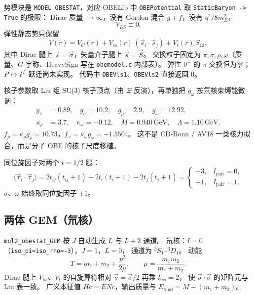\documentclass[12pt,a4paper]{article}
\newcommand{\GeV}{\,\mathrm{GeV}}
\begin{document}
势模块是 \texttt{MODEL\_OBESTAT}，对应 OBELib 中
\texttt{OBEPotential} 取 \texttt{StaticBaryon -> True} 的极限：
Dirac 质量 $\to\infty$，没有 Gordon 混合 $g+f$，没有 $q^2/8m_B^2$，
\begin{equation}
  V_{LS}\equiv 0.
\end{equation}
弹性静态势只保留
\begin{equation}
  V(r)=V_C(r)+V_{ss}(r)\,(\vec s_i\cdot\vec s_j)+V_t(r)\,S_{12},
\end{equation}
其中 Dirac 腿上 $\vec s=\vec\sigma$，矢量介子腿上 $\vec s=\vec S$。
交换粒子固定为 $\pi,\sigma,\rho,\omega$（质量、$G$ 宇称、HeavySign 写在
\texttt{obemodel.c} 内部表）。
弹性 $0^-$ 的 $\pi$ 交换恒为零；$P\leftrightarrow P^*$ 跃迁尚未实现。
代码中 \texttt{OBEVls1}、\texttt{OBEVls2} 直接返回 $0$。

核子参数取 Liu 组 SU(3) 核子顶点（由 $\Xi$ 反演），再单独把 $g_\omega$
按氘核束缚能微调：
\begin{equation}
\begin{aligned}
  g_\pi&=0.89,\quad
  g_\sigma=10.2,\quad
  g_\rho=2.9,\quad
  g_\omega=12.92,\\
  \kappa_\rho&=3.7,\quad
  \kappa_\omega=-0.12,\quad
  M=0.940\GeV,\quad
  \Lambda=1.10\GeV.
\end{aligned}
\end{equation}
$f_\rho=\kappa_\rho g_\rho=10.73$，$f_\omega=\kappa_\omega g_\omega=-1.5504$。
这不是 CD-Bonn / AV18 一类核力拟合，而是分子 OBE 的核子尺度移植。

同位旋因子对两个 $t=1/2$ 腿：
\begin{equation}
  \langle\vec\tau_i\cdot\vec\tau_j\rangle
  =2t_{ij}(t_{ij}+1)-2t_i(t_i+1)-2t_j(t_j+1)
  =
  \begin{cases}
    -3, & I_{\mathrm{pair}}=0,\\
    +1, & I_{\mathrm{pair}}=1.
  \end{cases}
\end{equation}
$\sigma$、$\omega$ 始终取同位旋因子 $+1$。

\subsection{两体 GEM（氘核）}

\texttt{mol2\_obestat\_GEM} 按 $J$ 自动生成 $L$ 与 $L+2$ 通道。
氘核：$I=0$（\texttt{iso\_pi=iso\_rho=-3}），$J=1$，$L=0$，
通道为 ${}^3S_1$--${}^3D_1$。
动能
\begin{equation}
  T=m_1+m_2+\frac{p^2}{2\mu},\qquad \mu=\frac{m_1 m_2}{m_1+m_2}.
\end{equation}
Dirac 腿上 $V_{ss}$、$V_t$ 的自旋算符相对 $\vec s=\vec\sigma/2$ 再乘 $k_{ss}=2$，
使 $\vec\sigma\cdot\vec\sigma$ 的矩阵元与 Liu 表一致。
广义本征值 $Hc=ENc$，输出质量与 $E_{\mathrm{bind}}=M-(m_1+m_2)$。
\end{document}
